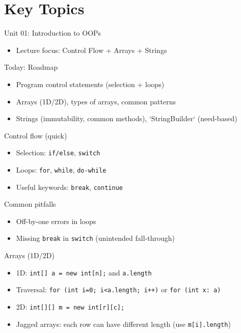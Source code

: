 \documentclass{beamer}
\begin{document}
\section{Key Topics}
\label{sec:concepts}

\begin{frame}{Unit 01: Introduction to OOPs}
  \begin{itemize}[<+->]
    \item Lecture focus: Control Flow + Arrays + Strings
  \end{itemize}
  \slidesources{\OOPSUnitISources}
\end{frame}

\begin{frame}{Today: Roadmap}
  \begin{itemize}[<+->]
    \item Program control statements (selection + loops)
    \item Arrays (1D/2D), types of arrays, common patterns
    \item Strings (immutability, common methods), `StringBuilder` (need-based)
  \end{itemize}
  \slidesources{\OOPSUnitISources}
\end{frame}

\begin{frame}{Control flow (quick)}
  \begin{itemize}[<+->]
    \item Selection: \texttt{if/else}, \texttt{switch}
    \item Loops: \texttt{for}, \texttt{while}, \texttt{do-while}
    \item Useful keywords: \texttt{break}, \texttt{continue}
  \end{itemize}
  \begin{block}{Common pitfalls}
    \begin{itemize}
      \item Off-by-one errors in loops
      \item Missing \texttt{break} in \texttt{switch} (unintended fall-through)
    \end{itemize}
  \end{block}
  \slidesources{\OOPSUnitISources}
\end{frame}

\begin{frame}{Arrays (1D/2D)}
  \begin{itemize}[<+->]
    \item 1D: \texttt{int[] a = new int[n];} and \texttt{a.length}
    \item Traversal: \texttt{for (int i=0; i<a.length; i++)} or \texttt{for (int x: a)}
    \item 2D: \texttt{int[][] m = new int[r][c];}
    \item Jagged arrays: each row can have different length (use \texttt{m[i].length})
  \end{itemize}
  \slidesources{\OOPSUnitISources}
\end{frame}
\end{document}
